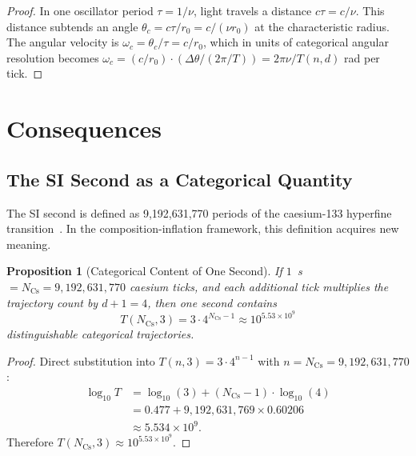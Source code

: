 \documentclass[twocolumn,10pt,a4paper]{article}
\newtheorem{proposition}[theorem]{Proposition}
\theoremstyle{definition}
\theoremstyle{remark}
\begin{document}
\begin{proof}
In one oscillator period $\tau = 1/\nu$, light travels a distance $c\tau = c/\nu$. This distance subtends an angle $\theta_c = c\tau / r_0 = c / (\nu r_0)$ at the characteristic radius. The angular velocity is $\omega_c = \theta_c / \tau = c / r_0$, which in units of categorical angular resolution becomes $\omega_c = (c/r_0) \cdot (\Delta\theta / (2\pi/T)) = 2\pi\nu / T(n,d)$ rad per tick.
\end{proof}




\section{Consequences}
\label{sec:consequences}

\subsection{The SI Second as a Categorical Quantity}

The SI second is defined as 9,192,631,770 periods of the caesium-133 hyperfine transition~\cite{bipm2019}. In the composition-inflation framework, this definition acquires new meaning.

\begin{proposition}[Categorical Content of One Second]
\label{prop:one_second}
If $1$~s $= N_{\mathrm{Cs}} = 9{,}192{,}631{,}770$ caesium ticks, and each additional tick multiplies the trajectory count by $d+1 = 4$, then one second contains
\begin{equation}
T(N_{\mathrm{Cs}}, 3) = 3 \cdot 4^{N_{\mathrm{Cs}} - 1} \approx 10^{5.53 \times 10^{9}}
\end{equation}
distinguishable categorical trajectories.
\end{proposition}

\begin{proof}
Direct substitution into $T(n,3) = 3 \cdot 4^{n-1}$ with $n = N_{\mathrm{Cs}} = 9{,}192{,}631{,}770$:
\begin{align}
\log_{10} T &= \log_{10}(3) + (N_{\mathrm{Cs}} - 1) \cdot \log_{10}(4) \nonumber \\
            &= 0.477 + 9{,}192{,}631{,}769 \times 0.60206 \nonumber \\
            &\approx 5.534 \times 10^{9}.
\end{align}
Therefore $T(N_{\mathrm{Cs}}, 3) \approx 10^{5.53 \times 10^9}$.
\end{proof}
\end{document}
